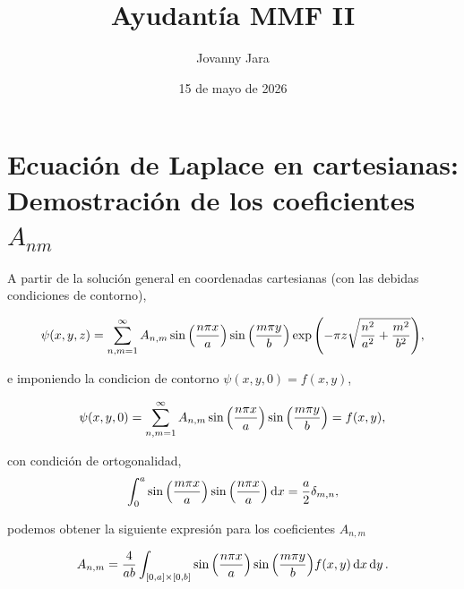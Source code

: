 \documentclass[11pt]{article}
\title{Ayudantía MMF II}
\author{Jovanny Jara}
\date{15 de mayo de 2026}
\theoremstyle{definition}
\numberwithin{equation}{section}
\begin{document}
\maketitle

\section{Ecuación de Laplace en cartesianas: Demostración de los coeficientes $A_{nm}$}

A partir de la solución general en coordenadas cartesianas (con las debidas condiciones de contorno),

\begin{equation}
    \psi(x,y,z) = \sum_{n,m=1}^{\infty} A_{n,m}\sin\pqty{\frac{n\pi x}{a}}\sin\pqty{\frac{m\pi y}{b}}
    \exp\pqty{-\pi z\sqrt{\frac{n^2}{a^2} + \frac{m^2}{b^2}}},
\end{equation}

e imponiendo la condicion de contorno $\psi(x,y,0) = f(x,y)$, 

\begin{equation}
    \psi(x,y,0) = \sum_{n,m=1}^{\infty} A_{n,m}\sin\pqty{\frac{n\pi x}{a}}\sin\pqty{\frac{m\pi y}{b}} = f(x,y),
\end{equation}

con condición de ortogonalidad,
\begin{equation}
    \int_0^a \sin\pqty{\frac{m\pi x}{a}}\sin\pqty{\frac{n\pi x}{a}}\dd{x} = \frac{a}{2}\delta_{m,n},
\end{equation}

podemos obtener la siguiente expresión para los coeficientes $A_{n,m}$ 

\begin{equation}
    A_{n,m} = \frac{4}{ab}\int_{[0,a]\times[0,b]}\sin\pqty{\frac{n\pi x}{a}}\sin\pqty{\frac{m\pi y}{b}}f(x,y)\dd{x}\dd{y}.
\end{equation}
\end{document}
